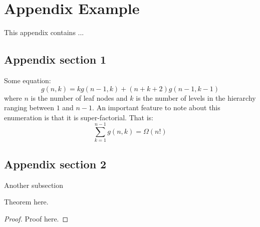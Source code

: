 \chapter{Appendix Example}\label{app:example1}

This appendix contains ...

\section{Appendix section 1}
Some equation:
\begin{equation}
g(n,k) = kg(n-1,k)+(n+k+2)g(n-1,k-1)
\end{equation}
where $n$ is the number of leaf nodes and $k$ is the number of levels in the hierarchy ranging between $1$ and $n-1$. An important feature to note about this enumeration is that it is super-factorial. That is:
\begin{equation}
\sum_{k=1}^{n-1} g(n,k) = \Omega (n!)
\end{equation}

\section{Appendix section 2}\label{app:example}

Another subsection

\begin{theorem}
Theorem here.
\end{theorem}

\begin{proof}
    Proof here.
\end{proof}
